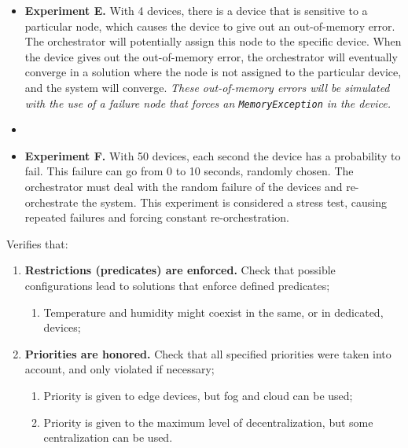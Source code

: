 \begin{enumerate}
\begin{itemize}
            \item \textbf{Experiment E.} With 4 devices, there is a device that is sensitive to a particular node, which causes the device to give out an out-of-memory error. The orchestrator will potentially assign this node to the specific device. When the device gives out the out-of-memory error, the orchestrator will eventually converge in a solution where the node is not assigned to the particular device, and the system will converge.  \textit{These out-of-memory errors will be simulated with the use of a failure node that forces an \texttt{MemoryException} in the device.}
            \item \item \textbf{Experiment F.} With 50 devices, each second the device has a probability to fail. This failure can go from 0 to 10 seconds, randomly chosen. The orchestrator must deal with the random failure of the devices and re-orchestrate the system. This experiment is considered a stress test, causing repeated failures and forcing constant re-orchestration.
        \end{itemize}
        Verifies that:
        \begin{enumerate}
            \item \textbf{Restrictions (predicates) are enforced.} Check that possible configurations lead to solutions that enforce defined predicates;
                \begin{enumerate}
                    \item Temperature and humidity might coexist in the same, or in dedicated, devices;
                \end{enumerate}
            \item \textbf{Priorities are honored.} Check that all specified priorities were taken into account, and only violated if necessary;
                \begin{enumerate}
                    \item Priority is given to edge devices, but fog and cloud can be used;
                    \item Priority is given to the maximum level of decentralization, but some centralization can be used.
                \end{enumerate}
        \end{enumerate}
\end{enumerate}

